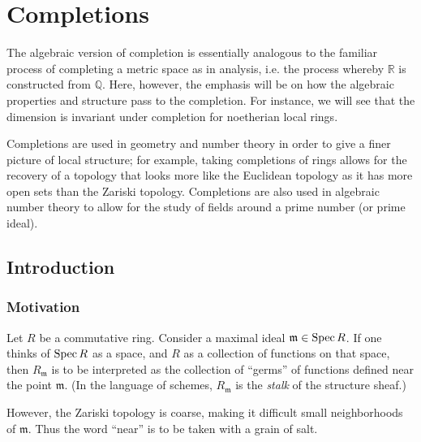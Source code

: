 \chapter{Completions}
\label{completions}

The algebraic version of completion is essentially analogous to the familiar
process of completing a metric space as in analysis, i.e. the process whereby $\mathbb{R}$ is constructed from
$\mathbb{Q}$. Here, however, the emphasis will be on how the algebraic properties and
structure pass to the completion. For instance, we will see that the
dimension is invariant under completion for noetherian local rings.


Completions are used in geometry and number theory in order to give a finer picture of local structure; for example, taking completions of rings allows for the recovery of a topology that looks more like the Euclidean topology as it has more open sets than the Zariski topology. Completions are also used in algebraic number theory to allow for the study of fields around a prime number (or prime ideal). 

\section{Introduction}

\subsection{Motivation}

Let $R$ be a commutative ring. Consider a maximal ideal $\mathfrak{m} \in \operatorname{Spec}
R$. If one thinks of $\operatorname{Spec} R$ as a space, and $R$ as a collection of functions
on that space, then $R_{\mathfrak{m}}$ is to be interpreted as the collection of ``germs'' of
functions defined near the point $\mathfrak{m}$. (In the language of schemes,
$R_{\mathfrak{m}}$ is the \emph{stalk} of the structure sheaf.)

However, the Zariski topology is coarse, making it difficult small neighborhoods of $\mathfrak{m}$.
Thus the word ``near'' is to be taken with a grain of salt. 

